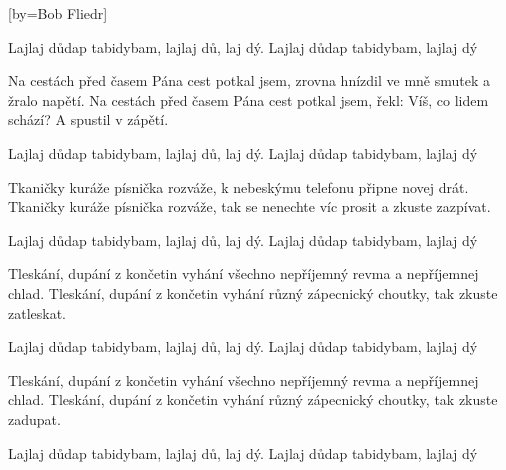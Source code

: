 [by={Bob Fliedr}]

\beginchorus{}
\lrep{} Lajlaj důdap tabidybam, lajlaj dů, laj dý.
Lajlaj důdap tabidybam, lajlaj dý \rrep{}
\endchorus{}

\beginverse{}
Na cestách před časem Pána cest potkal jsem,
zrovna hnízdil ve mně smutek a žralo napětí.
Na cestách před časem Pána cest potkal jsem,
řekl: Víš, co lidem schází? A spustil v zápětí.
\endverse{}

\repeatingchorus{}
\beginchorus{}
\lrep{} Lajlaj důdap tabidybam, lajlaj dů, laj dý.
Lajlaj důdap tabidybam, lajlaj dý \rrep{}
\endchorus{}

\beginverse{}
Tkaničky kuráže písnička rozváže,
k nebeskýmu telefonu připne novej drát.
Tkaničky kuráže písnička rozváže,
tak se nenechte víc prosit a zkuste zazpívat.
\endverse{}

\repeatingchorus{}
\beginchorus{}
\lrep{} Lajlaj důdap tabidybam, lajlaj dů, laj dý.
Lajlaj důdap tabidybam, lajlaj dý \rrep{}
\endchorus{}

\beginverse{}
Tleskání, dupání z končetin vyhání
všechno nepříjemný revma a nepříjemnej chlad.
Tleskání, dupání z končetin vyhání
různý zápecnický choutky, tak zkuste zatleskat.
\endverse{}

\repeatingchorus{}
\beginchorus{}
\lrep{} Lajlaj důdap tabidybam, lajlaj dů, laj dý.
Lajlaj důdap tabidybam, lajlaj dý \rrep{}
\endchorus{}

\beginverse{}
Tleskání, dupání z končetin vyhání
všechno nepříjemný revma a nepříjemnej chlad.
Tleskání, dupání z končetin vyhání
různý zápecnický choutky, tak zkuste zadupat.
\endverse{}

\repeatingchorus{}
\beginchorus{}
\lrep{} Lajlaj důdap tabidybam, lajlaj dů, laj dý.
Lajlaj důdap tabidybam, lajlaj dý \rrep{}
\endchorus{}

\endsong{}
